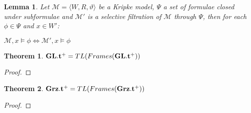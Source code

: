 \documentclass[a4paper]{article}
\theoremstyle{defin}
\theoremstyle{theorem}
\newtheorem{theorem}{Theorem}
\theoremstyle{prop}
\theoremstyle{lemma}
\newtheorem{lemma}{Lemma}
\theoremstyle{ex}
\theoremstyle{col}
\begin{document}
\begin{lemma}
  Let $\mathcal{M} = \langle W, R, \vartheta \rangle$ be a Kripke model, $\Psi$ a set of formulae closed under subformulae and $\mathcal{M}'$ is a selective filtration of $\mathcal{M}$ through $\Psi$, then for each $\phi \in \Psi$ and $x \in W'$:

  \begin{center}
    $\mathcal{M}, x \models \phi \Leftrightarrow \mathcal{M}', x \models \phi$
  \end{center}
\end{lemma}

\begin{theorem}
  ${\bf GL}.{\bf t}^{+} = TL(Frames({\bf GL}.{\bf t}^{+}))$
\end{theorem}

\begin{proof}
\end{proof}

\begin{theorem}
  ${\bf Grz}.{\bf t}^{+} = TL(Frames({\bf Grz}.{\bf t}^{+}))$
\end{theorem}

\begin{proof}
\end{proof}
\end{document}
